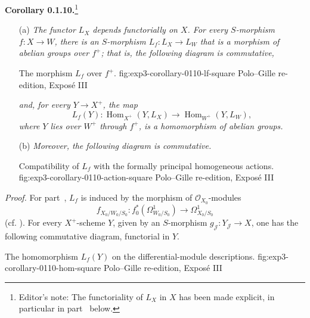 \medskip
\noindent{}\textbf{Corollary 0.1.10.}\footnote{Editor's note: The
functoriality of \(L_X\) in \(X\) has been made explicit, in particular
in part~ below.}
\begin{enumerate}
\item[\SGAInlineRefTarget{sga3:iii:corollary:0-1-10:item:a}(a)] \textit{The functor \(L_X\) depends functorially on
  \(X\). For every \(S\)-morphism \(f:X\to W\), there is an
  \(S\)-morphism \(L_f:L_X\to L_W\) that is a morphism of abelian
  groups over \(f^+\); that is, the following diagram is commutative,}

    {The morphism \(L_f\) over \(f^+\).}
    {fig:exp3-corollary-0110-lf-square}
    {Polo--Gille re-edition, Expos\'e III}

  \textit{and, for every \(Y\to X^+\), the map}
  \[
   L_f(Y):\operatorname{Hom}_{X^+}(Y,L_X)
   \longrightarrow\operatorname{Hom}_{W^+}(Y,L_W),
  \]
  \textit{where \(Y\) lies over \(W^+\) through \(f^+\), is a
  homomorphism of abelian groups.}

\item[\SGAInlineRefTarget{sga3:iii:corollary:0-1-10:item:b}(b)] \textit{Moreover, the following diagram is commutative.}

    {Compatibility of \(L_f\) with the formally principal homogeneous actions.}
    {fig:exp3-corollary-0110-action-square}
    {Polo--Gille re-edition, Expos\'e III}
\end{enumerate}

\noindent\textit{Proof.}
For part~, \(L_f\) is induced by the morphism of
\(\mathscr O_{X_0}\)-modules
\[
 f_{X_0/W_0/S_0}:f_0^*(\Omega^1_{W_0/S_0})
 \longrightarrow\Omega^1_{X_0/S_0}
\]
(cf. ). For every \(X^+\)-scheme \(Y\), given by an
\(S\)-morphism \(g_{\mathscr J}:Y_{\mathscr J}\to X\), one has the
following commutative diagram, functorial in \(Y\).

  {The homomorphism \(L_f(Y)\) on the differential-module descriptions.}
  {fig:exp3-corollary-0110-hom-square}
  {Polo--Gille re-edition, Expos\'e III}

